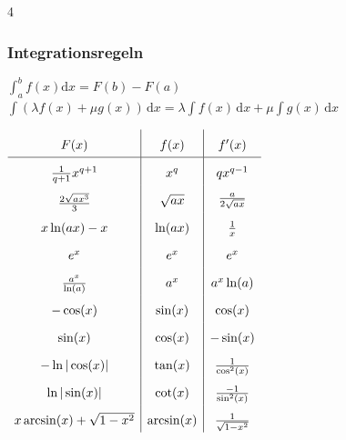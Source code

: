 \documentclass[6pt,a4paper]{scrartcl}
\begin{document}
\begin{multicols*}{4}
    \subsubsection{Integrationsregeln}
    $\int_a^b f(x) \mathrm dx = F(b) - F(a)$\\
    $\int(\lambda f(x)+\mu g(x)) \, \mathrm dx=\lambda\int f(x) \, \mathrm dx + \mu\int g(x) \, \mathrm dx$

    \everymath{\displaystyle}	%
    \begin{math}\renewcommand{\arraystretch}{1.8}
        \begin{array}{c|c|c}
            F(x)                                                & f(x)                      & f'(x)                                    \\ \hline
            \frac{1}{q+1}x^{q+1}                                & x^q                       & qx^{q-1}                                 \\
            \raisebox{-0.2em}{$\frac{2\sqrt{ax^3}}{3}$}         & \sqrt{ax}                 & \raisebox{0.2em}{$\frac{a}{2\sqrt{ax}}$} \\
            x\ln(ax) -x                                         & \ln(ax)                   & \textstyle \frac{1}{x}                   \\
            e^x                                                 & e^x                       & e^x                                      \\
            \frac{a^x}{\ln(a)}                                  & a^x                       & a^x \ln(a)                               \\
            -\cos(x)                                            & \sin(x)                   & \cos(x)                                  \\
            \sin(x)                                             & \cos(x)                   & -\sin(x)                                 \\
            -\ln |\cos(x)|                                      & \tan(x)                   & \frac{1}{\cos^2(x)}                      \\
            \ln |\sin(x)|                                       & \cot(x)                   & \frac{-1}{\sin^2(x)}                     \\
            x\arcsin (x)+\sqrt{1-x^2}                           & \arcsin(x)                & \frac{1}{\sqrt{1-x^2}}                   \\

\end{array}
\end{math}
\end{multicols*}
\end{document}
